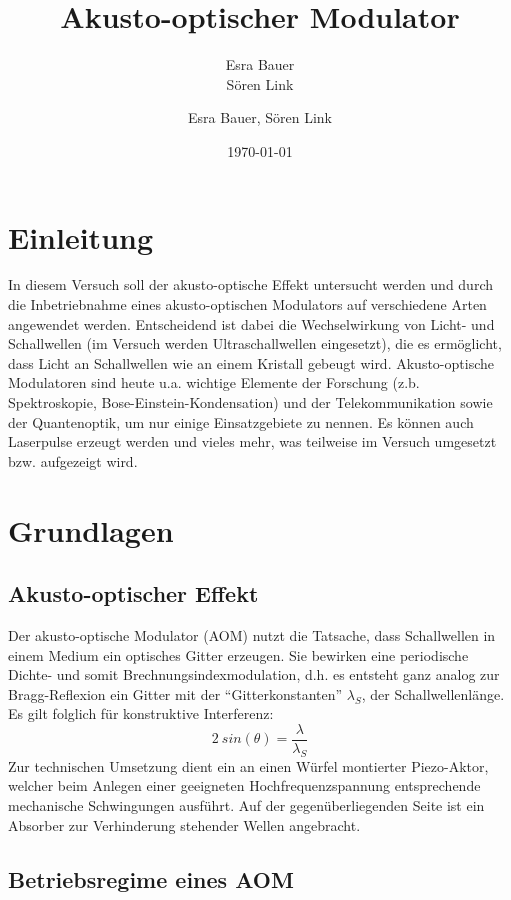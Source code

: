 \documentclass[bigchapter,colorback,accentcolor=tud4b,linedtoc,11pt]{tudreport}
\title{Akusto-optischer Modulator}
\subtitle{Esra Bauer  \\Sören Link}
\author{Esra Bauer, Sören Link}
\date{\today}
\begin{document}

\maketitle

\tableofcontents


\chapter{Einleitung}

In diesem Versuch soll der akusto-optische Effekt untersucht werden und durch die Inbetriebnahme eines akusto-optischen Modulators auf verschiedene Arten angewendet werden. Entscheidend ist dabei die Wechselwirkung von Licht- und Schallwellen (im Versuch werden Ultraschallwellen eingesetzt), die es ermöglicht, dass Licht an Schallwellen wie an einem Kristall gebeugt wird. Akusto-optische Modulatoren sind heute u.a. wichtige Elemente der Forschung (z.b. Spektroskopie, Bose-Einstein-Kondensation) und der Telekommunikation sowie der Quantenoptik, um nur einige Einsatzgebiete zu nennen. Es können auch Laserpulse erzeugt werden und vieles mehr, was teilweise im Versuch umgesetzt bzw. aufgezeigt wird.

\chapter{Grundlagen}
\section{Akusto-optischer Effekt}

Der akusto-optische Modulator (AOM) nutzt die Tatsache, dass Schallwellen in einem Medium ein optisches Gitter erzeugen. Sie bewirken eine periodische Dichte- und somit Brechnungsindexmodulation, d.h. es entsteht ganz analog zur Bragg-Reflexion ein Gitter mit der ``Gitterkonstanten'' $\lambda_S$, der Schallwellenlänge. Es gilt folglich für konstruktive Interferenz: 
$$2~sin(\theta) = \frac{\lambda}{\lambda_S}$$ 
Zur technischen Umsetzung dient ein an einen Würfel montierter Piezo-Aktor, welcher beim Anlegen einer geeigneten Hochfrequenzspannung entsprechende mechanische Schwingungen ausführt. Auf der gegenüberliegenden Seite ist ein Absorber zur Verhinderung stehender Wellen angebracht.

\section{Betriebsregime eines AOM}
\end{document}
